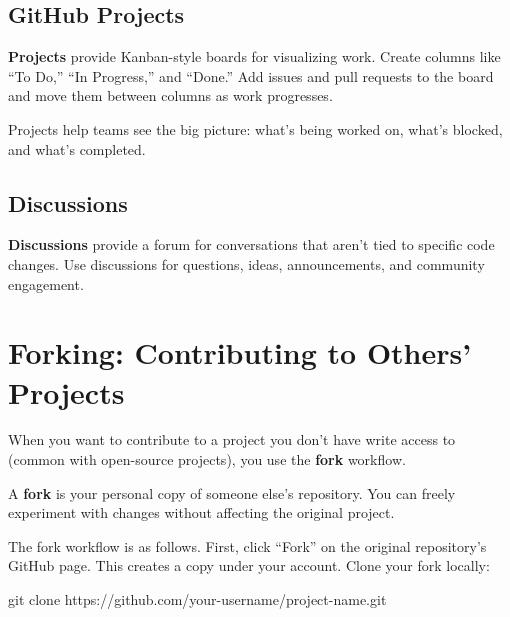\documentclass[
  letterpaper,
  DIV=11,
  numbers=noendperiod]{scrreprt}
\newenvironment{Shaded}{\begin{snugshade}}{\end{snugshade}}
\newcommand{\FunctionTok}[1]{\textcolor[rgb]{0.28,0.35,0.67}{#1}}
\newcommand{\NormalTok}[1]{\textcolor[rgb]{0.00,0.23,0.31}{#1}}
\begin{document}
\subsection{GitHub Projects}\label{github-projects}

\textbf{Projects} provide Kanban-style boards for visualizing work.
Create columns like ``To Do,'' ``In Progress,'' and ``Done.'' Add issues
and pull requests to the board and move them between columns as work
progresses.

Projects help teams see the big picture: what's being worked on, what's
blocked, and what's completed.

\subsection{Discussions}\label{discussions}

\textbf{Discussions} provide a forum for conversations that aren't tied
to specific code changes. Use discussions for questions, ideas,
announcements, and community engagement.

\section{Forking: Contributing to Others'
Projects}\label{forking-contributing-to-others-projects}

When you want to contribute to a project you don't have write access to
(common with open-source projects), you use the \textbf{fork} workflow.

A \textbf{fork} is your personal copy of someone else's repository. You
can freely experiment with changes without affecting the original
project.

The fork workflow is as follows. First, click ``Fork'' on the original
repository's GitHub page. This creates a copy under your account. Clone
your fork locally:

\begin{codelisting}

\caption{\texttt{terminal}}

\begin{Shaded}
\begin{Highlighting}[]
\FunctionTok{git}\NormalTok{ clone https://github.com/your{-}username/project{-}name.git}
\end{Highlighting}
\end{Shaded}

\end{codelisting}
\end{document}
